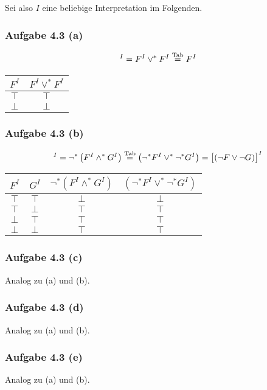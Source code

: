 Sei also $I$ eine beliebige Interpretation im Folgenden.

\subsubsection{Aufgabe 4.3 (a)}
\begin{align*}
	[(F\vee F)]^I=F^I\vee^\ast F^I\stackeq{\text{Tab}} F^I
\end{align*}
\begin{tabular}{c||c}
	$F^I$ & $F^I\vee^\ast F^I$\\ \hline
	$\top$ & $\top$\\
	$\bot$ & $\bot$
\end{tabular}

\subsubsection{Aufgabe 4.3 (b)}
\begin{align*}
	[\neg(F\wedge G)]^I=\neg^\ast\left(F^I\wedge^\ast G^I\right)\stackeq{\text{Tab}}
	\left(\neg^\ast F^I\vee^\ast\neg^\ast G^I\right)=\big[(\neg F\vee\neg G)\big]^I
\end{align*}

\begin{tabular}{c|c||c|c}
	$F^I$ & $G^I$ & $\neg^\ast(F^I\wedge^\ast G^I)$ & $(\neg^\ast F^I\vee^\ast\neg^\ast G^I)$\\ \hline
	$\top$ & $\top$ & $\bot$ & $\bot$\\
	$\top$ & $\bot$ & $\top$ & $\top$\\
	$\bot$ & $\top$ & $\top$ & $\top$\\
	$\bot$ & $\bot$ & $\top$ & $\top$
\end{tabular}

\subsubsection{Aufgabe 4.3 (c)}
Analog zu (a) und (b).

\subsubsection{Aufgabe 4.3 (d)}
Analog zu (a) und (b).

\subsubsection{Aufgabe 4.3 (e)}
Analog zu (a) und (b).

